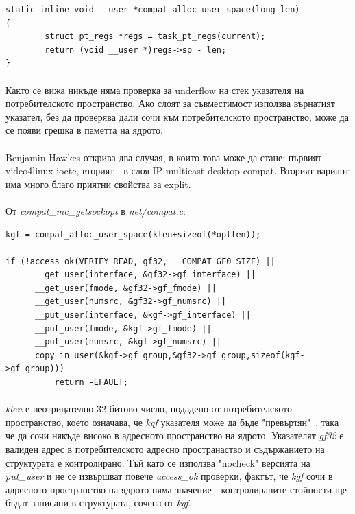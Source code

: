 \documentclass[a4paper,12pt,leqno]{article}
\begin{document}
\begin{verbatim}
static inline void __user *compat_alloc_user_space(long len)                    
{                                                                               
        struct pt_regs *regs = task_pt_regs(current);                           
        return (void __user *)regs->sp - len;                                   
}
\end{verbatim}
\paragraph{}
Както се вижа никъде няма проверка за underflow на стек указателя на потребителското пространство. Ако слоят за съвместимост използва върнатият указател, без да проверява дали сочи към потребителското пространство, може да се появи грешка в паметта на ядрото.
\paragraph{}
Benjamin Hawkes открива два случая, в които това може да стане: първият - video4linux iocte, вторият - в слоя IP multicast desktop compat. Вторият вариант има много благо приятни свойства за explit.
\paragraph{}
От \textit{compat\_mc\_getsockopt} в \textit{net/compat.c}:
\begin{verbatim}
kgf = compat_alloc_user_space(klen+sizeof(*optlen));                            
                                                                                
if (!access_ok(VERIFY_READ, gf32, __COMPAT_GF0_SIZE) ||                         
      __get_user(interface, &gf32->gf_interface) ||                             
      __get_user(fmode, &gf32->gf_fmode) ||                                     
      __get_user(numsrc, &gf32->gf_numsrc) ||                                   
      __put_user(interface, &kgf->gf_interface) ||                              
      __put_user(fmode, &kgf->gf_fmode) ||                                      
      __put_user(numsrc, &kgf->gf_numsrc) ||                                    
      copy_in_user(&kgf->gf_group,&gf32->gf_group,sizeof(kgf->gf_group)))       
          return -EFAULT;
\end{verbatim}
\paragraph{}
\textit{klen} е неотрицателно 32-битово число, подадено от потребителското пространство, което означава, че \textit{kgf} указателя може да бъде "превъртян"\ , така че да сочи някъде високо в адресното пространство на ядрото. Указателят \textit{gf32} е валиден адрес в потребителското адресно пространаство и съдържанието на структурата е контролирано. Тъй като се използва "nocheck" версията на \textit{put\_user} и не се извършват повече \textit{access\_ok} проверки, фактът, че \textit{kgf} сочи в адресното пространство на ядрото няма значение - контролираните стойности ще бъдат записани в структурата, сочена от \textit{kgf}.
\end{document}
